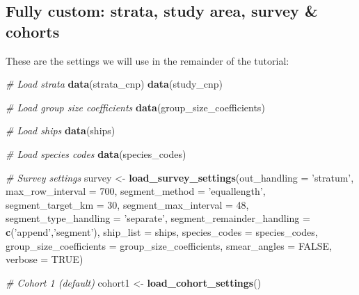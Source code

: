 \documentclass[
]{book}
\newenvironment{Shaded}{\begin{snugshade}}{\end{snugshade}}
\newcommand{\CommentTok}[1]{\textcolor[rgb]{0.56,0.35,0.01}{\textit{#1}}}
\newcommand{\DataTypeTok}[1]{\textcolor[rgb]{0.13,0.29,0.53}{#1}}
\newcommand{\DecValTok}[1]{\textcolor[rgb]{0.00,0.00,0.81}{#1}}
\newcommand{\KeywordTok}[1]{\textcolor[rgb]{0.13,0.29,0.53}{\textbf{#1}}}
\newcommand{\NormalTok}[1]{#1}
\newcommand{\OtherTok}[1]{\textcolor[rgb]{0.56,0.35,0.01}{#1}}
\newcommand{\StringTok}[1]{\textcolor[rgb]{0.31,0.60,0.02}{#1}}
\begin{document}
\hypertarget{fully-custom-strata-study-area-survey-cohorts}{%
\subsection*{Fully custom: strata, study area, survey \& cohorts}\label{fully-custom-strata-study-area-survey-cohorts}}

These are the settings we will use in the remainder of the tutorial:

\begin{Shaded}
\begin{Highlighting}[]
\CommentTok{# Load strata}
\KeywordTok{data}\NormalTok{(strata_cnp)}
\KeywordTok{data}\NormalTok{(study_cnp)}

\CommentTok{# Load group size coefficients}
\KeywordTok{data}\NormalTok{(group_size_coefficients)}

\CommentTok{# Load ships}
\KeywordTok{data}\NormalTok{(ships)}

\CommentTok{# Load species codes}
\KeywordTok{data}\NormalTok{(species_codes)}

\CommentTok{# Survey settings}
\NormalTok{survey <-}\StringTok{ }
\StringTok{  }\KeywordTok{load_survey_settings}\NormalTok{(}\DataTypeTok{out_handling =} \StringTok{'stratum'}\NormalTok{,}
                       \DataTypeTok{max_row_interval =} \DecValTok{700}\NormalTok{,}
                       \DataTypeTok{segment_method =} \StringTok{'equallength'}\NormalTok{,}
                       \DataTypeTok{segment_target_km =} \DecValTok{30}\NormalTok{,}
                       \DataTypeTok{segment_max_interval =} \DecValTok{48}\NormalTok{,}
                       \DataTypeTok{segment_type_handling =} \StringTok{'separate'}\NormalTok{,}
                       \DataTypeTok{segment_remainder_handling =} \KeywordTok{c}\NormalTok{(}\StringTok{'append'}\NormalTok{,}\StringTok{'segment'}\NormalTok{),}
                       \DataTypeTok{ship_list =}\NormalTok{ ships,}
                       \DataTypeTok{species_codes =}\NormalTok{ species_codes,}
                       \DataTypeTok{group_size_coefficients =}\NormalTok{ group_size_coefficients,}
                       \DataTypeTok{smear_angles =} \OtherTok{FALSE}\NormalTok{,}
                       \DataTypeTok{verbose =} \OtherTok{TRUE}\NormalTok{)}

\CommentTok{# Cohort 1 (default)}
\NormalTok{cohort1 <-}\StringTok{ }\KeywordTok{load_cohort_settings}\NormalTok{()}


\end{Highlighting}
\end{Shaded}
\end{document}
